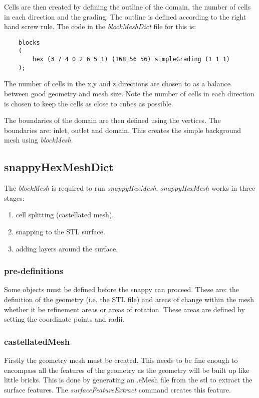 \documentclass{article}
\begin{document}
	Cells are then created by defining the outline of the domain, the number of cells in each direction and the grading. The outline is defined according to the right hand screw rule. The code in the \textit{blockMeshDict} file for this is:
	\begin{lstlisting}
	blocks
	(
		hex (3 7 4 0 2 6 5 1) (168 56 56) simpleGrading (1 1 1)
	);\end{lstlisting}
	
	The number of cells in the x,y and z directions are chosen to as a balance between good geometry and mesh size. Note the number of cells in each direction is chosen to keep the cells as close to cubes as possible.  
	
	The boundaries of the domain are then defined using the vertices. The boundaries are: inlet, outlet and domain. This creates the simple background mesh using \textit{blockMesh}.
	
	\subsection{snappyHexMeshDict}
	The \textit{blockMesh} is required to run \textit{snappyHexMesh}. \textit{snappyHexMesh} works in three stages:
	\begin{enumerate}
		\item cell splitting (castellated mesh).
		\item snapping to the STL surface.
		\item adding layers around the surface.
	\end{enumerate}
	\subsubsection{pre-definitions}
	Some objects must be defined before the snappy can proceed. These are: the definition of the geometry (i.e. the STL file) and areas of change within the mesh whether it be refinement areas or areas of rotation. These areas are defined by setting the coordinate points and radii.
	\subsubsection{castellatedMesh}
	Firstly the geometry mesh must be created. This needs to be fine enough to encompass all the features of the geometry as the geometry will be built up like little bricks. This is done by generating an .eMesh file from the stl to extract the surface features. The \textit{surfaceFeatureExtract} command creates this feature.
	
	
\end{document}
